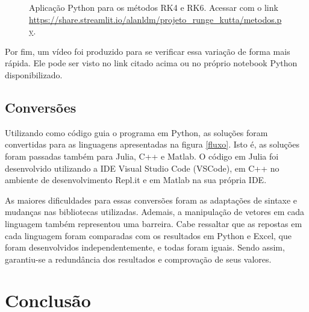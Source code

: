 \documentclass[a4paper,11pt]{article}
\begin{document}
    \begin{figure}[H]
        \centering
        \caption[width=\columnwidth]{Aplicação Python para os métodos RK4 e RK6. Acessar com o link \url{https://share.streamlit.io/alanldm/projeto_runge_kutta/metodos.py}.}
        \label{streamlit}
    \end{figure}
    
    Por fim, um vídeo foi produzido para se verificar essa variação de forma mais rápida. Ele pode ser visto no link citado acima ou no próprio notebook Python disponibilizado.

\subsection{Conversões}

    Utilizando como código guia o programa em Python, as soluções foram convertidas para as linguagens apresentadas na figura \ref{fluxo}. Isto é, as soluções foram passadas também para Julia, C++ e Matlab. O código em Julia foi desenvolvido utilizando a IDE Visual Studio Code (VSCode), em C++ no ambiente de desenvolvimento Repl.it e em Matlab na sua própria IDE. 
    
    
    As maiores dificuldades para essas conversões foram as adaptações de sintaxe e mudanças nas bibliotecas utilizadas. Ademais, a manipulação de vetores em cada linguagem também representou uma barreira. Cabe ressaltar que as repostas em cada linguagem foram comparadas com os resultados em Python e Excel, que foram desenvolvidos independentemente, e todas foram iguais. Sendo assim, garantiu-se a redundância dos resultados e comprovação de seus valores.

\pagebreak

\section{Conclusão}
\end{document}
